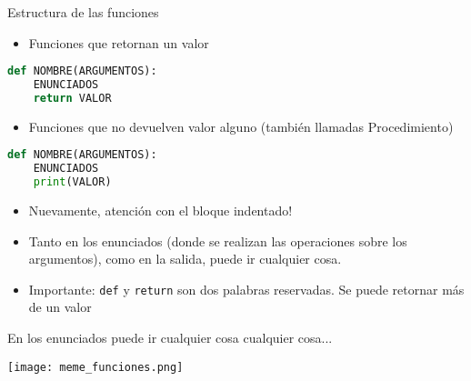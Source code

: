 \documentclass{beamer}
\begin{document}
\begin{frame}[fragile]{Estructura de las funciones} \pause


\begin{itemize}
	\item Funciones que retornan un valor
\end{itemize}
\begin{lstlisting}[language=Python]
def NOMBRE(ARGUMENTOS):
    ENUNCIADOS 
    return VALOR
\end{lstlisting} \pause

\begin{itemize}
        \item Funciones que no devuelven valor alguno (también llamadas Procedimiento)   
\end{itemize}
\begin{lstlisting}[language=Python]
def NOMBRE(ARGUMENTOS):
    ENUNCIADOS
    print(VALOR)
\end{lstlisting} \pause

\begin{itemize}
	\item Nuevamente, atención con el bloque indentado! \pause
	\item Tanto en los enunciados (donde se realizan las operaciones sobre los argumentos), como en la salida, puede ir cualquier cosa. \pause
	\item \alert{Importante:} \texttt{def} y \texttt{return} son dos palabras reservadas. \pause Se puede retornar más de un valor
\end{itemize}

\end{frame}


\begin{frame}{En los enunciados puede ir cualquier cosa cualquier cosa...} \pause
\begin{center}
\texttt{[image: meme\_funciones.png]}
\end{center}
\end{frame}
\end{document}
